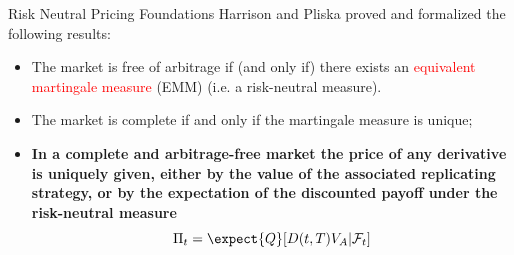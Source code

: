 \documentclass{beamer}
\begin{document}

\begin{frame}{Risk Neutral Pricing Foundations}
	Harrison and Pliska proved and formalized the following results:
	\begin{itemize}
		\item The market is free of arbitrage if (and only if) there exists an \textcolor{red}{equivalent martingale measure} (EMM) (i.e. a risk-neutral measure).
		\item The market is complete if and only if the martingale measure is unique;
		\item \textbf{In a complete and arbitrage-free market the price of any derivative is uniquely given, either by the value of the associated replicating strategy, or by the expectation of the discounted payoff under the risk-neutral measure}
		\begin{equation}
			\Pi_t = \expect{Q}[D(t,T)V_A|\mathcal{F}_t]
			\label{eq:risk_neutral_pricing}
		\end{equation}
	\end{itemize}
\end{frame}
\end{document}
